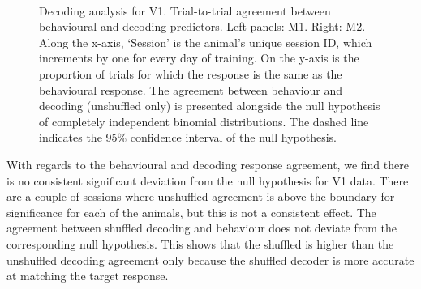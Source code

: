 \begin{figure}[htbp]
    ~~
    \caption{%
    Decoding analysis for \ac{V1}.
    Trial-to-trial agreement between behavioural and decoding predictors.
    Left panels: \ac{M1}. Right: \ac{M2}.
	Along the x-axis, `Session' is the animal's unique session ID, which increments by one for every day of training.
    On the y-axis is the proportion of trials for which the response is the same as the behavioural response.
    The agreement between behaviour and decoding (unshuffled only) is presented alongside the null hypothesis of completely independent binomial distributions.
    The dashed line indicates the 95\% confidence interval of the null hypothesis.
}
    \label{fig:decag_all_v1}
\end{figure}


With regards to the behavioural and decoding response agreement, we find there is no consistent significant deviation from the null hypothesis for \ac{V1} data.
There are a couple of sessions where unshuffled agreement is above the boundary for significance for each of the animals, but this is not a consistent effect.
The agreement between shuffled decoding and behaviour does not deviate from the corresponding null hypothesis.
This shows that the shuffled is higher than the unshuffled decoding agreement only because the shuffled decoder is more accurate at matching the target response.

